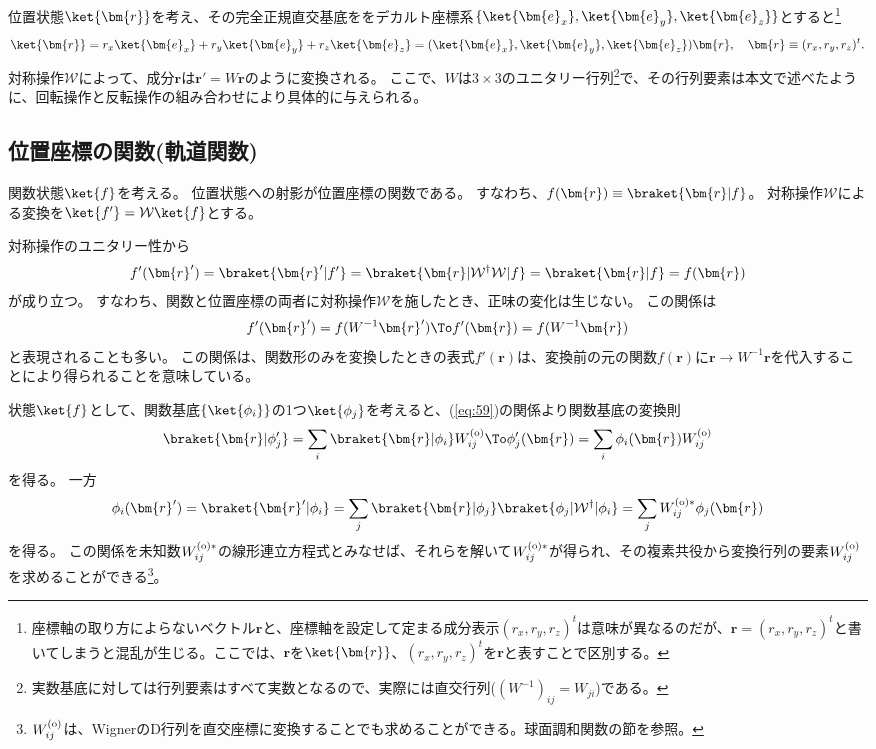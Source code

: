 \documentclass[11pt]{easymemo}
\begin{document}
位置状態$\ket{\bm{r}}$を考え、その完全正規直交基底ををデカルト座標系$\{\ket{\bm{e}_{x}}, \ket{\bm{e}_{y}}, \ket{\bm{e}_{z}}\}$とすると\footnote{座標軸の取り方によらないベクトル$\bm{r}$と、座標軸を設定して定まる成分表示$(r_{x},r_{y},r_{z})^{t}$は意味が異なるのだが、$\bm{r}=(r_{x},r_{y},r_{z})^{t}$と書いてしまうと混乱が生じる。ここでは、$\bm{r}$を$\ket{\bm{r}}$、$(r_{x},r_{y},r_{z})^{t}$を$\bm{r}$と表すことで区別する。}
\begin{align}
  \ket{\bm{r}}=r_{x}\ket{\bm{e}_{x}}+r_{y}\ket{\bm{e}_{y}}+r_{z}\ket{\bm{e}_{z}}
  =(\ket{\bm{e}_{x}},\ket{\bm{e}_{y}},\ket{\bm{e}_{z}})\bm{r},
  \quad
  \bm{r}\equiv (r_{x},r_{y},r_{z})^{t}.
\end{align}
対称操作$\mathcal{W}$によって、成分$\bm{r}$は$\bm{r}'=W\bm{r}$のように変換される。
ここで、$W$は$3\times 3$のユニタリー行列\footnote{実数基底に対しては行列要素はすべて実数となるので、実際には直交行列($(W^{-1})_{ij}=W_{ji}$)である。}で、その行列要素は本文で述べたように、回転操作と反転操作の組み合わせにより具体的に与えられる。


\subsection{位置座標の関数(軌道関数)}

関数状態$\ket{f}$を考える。
位置状態への射影が位置座標の関数である。
すなわち、$f(\bm{r})\equiv\braket{\bm{r}|f}$。
対称操作$\mathcal{W}$による変換を$\ket{f'}=\mathcal{W}\ket{f}$とする。

対称操作のユニタリー性から
\begin{align}
  f'(\bm{r}')=\braket{\bm{r}'|f'}=\braket{\bm{r}|\mathcal{W}^{\dagger}\mathcal{W}^{}|f}
  =\braket{\bm{r}|f}
  =f(\bm{r})
  \label{eq:60}
\end{align}
が成り立つ。
すなわち、関数と位置座標の両者に対称操作$\mathcal{W}$を施したとき、正味の変化は生じない。
この関係は
\begin{align*}
  f'(\bm{r}')=f(W^{-1}\bm{r}')
  \To
  f'(\bm{r})=f(W^{-1}\bm{r})
\end{align*}
と表現されることも多い。
この関係は、関数形のみを変換したときの表式$f'(\bm{r})$は、変換前の元の関数$f(\bm{r})$に$\bm{r}\to W^{-1}\bm{r}$を代入することにより得られることを意味している。


状態$\ket{f}$として、関数基底$\{\ket{\phi_{i}}\}$の1つ$\ket{\phi_{j}}$を考えると、(\ref{eq:59})の関係より関数基底の変換則
\begin{align}
  \braket{\bm{r}|\phi_{j}'}=\sum_{i}\braket{\bm{r}|\phi_{i}}W_{ij}^{\rm (o)}
  \To
  \phi_{j}'(\bm{r})=\sum_{i}\phi_{i}(\bm{r})W_{ij}^{\rm (o)}
\end{align}
を得る。
一方
\begin{align}
  \phi_{i}(\bm{r}')=\braket{\bm{r}'|\phi_{i}}
  =\sum_{j}\braket{\bm{r}|\phi_j}\braket{\phi_j|\mathcal{W}^{\dagger}|\phi_{i}}
  =\sum_{j}W_{ij}^{\rm (o)*}\phi_{j}(\bm{r})
\end{align}
を得る。
この関係を未知数$W_{ij}^{\rm (o)*}$の線形連立方程式とみなせば、それらを解いて$W_{ij}^{\rm (o)*}$が得られ、その複素共役から変換行列の要素$W_{ij}^{\rm (o)}$を求めることができる\footnote{$W_{ij}^{\rm (o)}$は、WignerのD行列を直交座標に変換することでも求めることができる。球面調和関数の節を参照。}。
\end{document}
